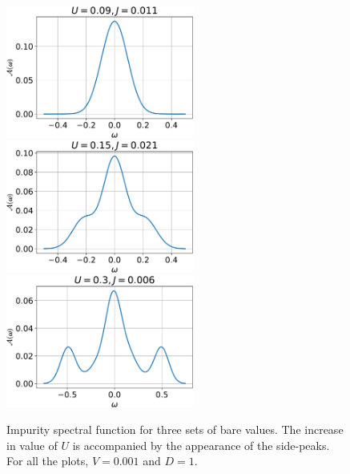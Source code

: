 \documentclass[12pt,twoside]{report}
\numberwithin{equation}{section}
\begin{document}
\begin{figure}[htpb]
	\centering
	\includegraphics[width=0.55\textwidth]{../figures/spec_func_1.pdf}
	\includegraphics[width=0.55\textwidth]{../figures/spec_func_2.pdf}
	\includegraphics[width=0.55\textwidth]{../figures/spec_func_3.pdf}
	\caption{Impurity spectral function for three sets of bare values. The increase in value of \(U\) is accompanied by the appearance of the side-peaks. For all the plots, \(V=0.001\) and \(D=1\).}
	\label{spec_func}
\end{figure}
\end{document}
